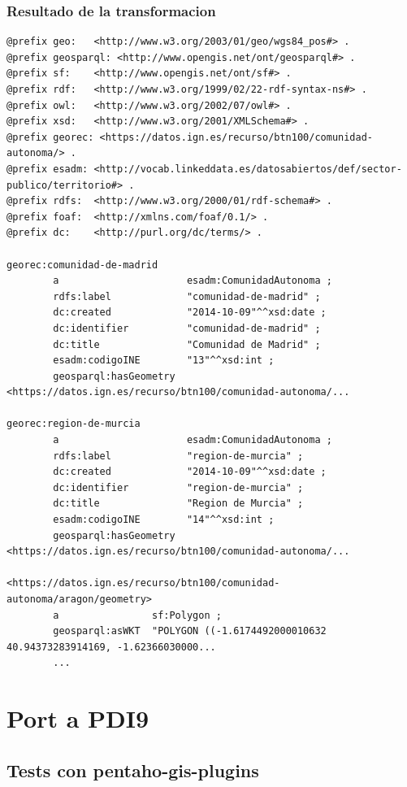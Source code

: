 \subsubsection{Resultado de la transformacion}
\footnotesize
\begin{verbatim}
@prefix geo:   <http://www.w3.org/2003/01/geo/wgs84_pos#> .
@prefix geosparql: <http://www.opengis.net/ont/geosparql#> .
@prefix sf:    <http://www.opengis.net/ont/sf#> .
@prefix rdf:   <http://www.w3.org/1999/02/22-rdf-syntax-ns#> .
@prefix owl:   <http://www.w3.org/2002/07/owl#> .
@prefix xsd:   <http://www.w3.org/2001/XMLSchema#> .
@prefix georec: <https://datos.ign.es/recurso/btn100/comunidad-autonoma/> .
@prefix esadm: <http://vocab.linkeddata.es/datosabiertos/def/sector-publico/territorio#> .
@prefix rdfs:  <http://www.w3.org/2000/01/rdf-schema#> .
@prefix foaf:  <http://xmlns.com/foaf/0.1/> .
@prefix dc:    <http://purl.org/dc/terms/> .

georec:comunidad-de-madrid
        a                      esadm:ComunidadAutonoma ;
        rdfs:label             "comunidad-de-madrid" ;
        dc:created             "2014-10-09"^^xsd:date ;
        dc:identifier          "comunidad-de-madrid" ;
        dc:title               "Comunidad de Madrid" ;
        esadm:codigoINE        "13"^^xsd:int ;
        geosparql:hasGeometry  <https://datos.ign.es/recurso/btn100/comunidad-autonoma/...

georec:region-de-murcia
        a                      esadm:ComunidadAutonoma ;
        rdfs:label             "region-de-murcia" ;
        dc:created             "2014-10-09"^^xsd:date ;
        dc:identifier          "region-de-murcia" ;
        dc:title               "Region de Murcia" ;
        esadm:codigoINE        "14"^^xsd:int ;
        geosparql:hasGeometry  <https://datos.ign.es/recurso/btn100/comunidad-autonoma/...

<https://datos.ign.es/recurso/btn100/comunidad-autonoma/aragon/geometry>
        a                sf:Polygon ;
        geosparql:asWKT  "POLYGON ((-1.6174492000010632 40.94373283914169, -1.62366030000...
        ...
\end{verbatim}
\normalsize


\section{Port a PDI9}

\subsection{Tests con pentaho-gis-plugins}

